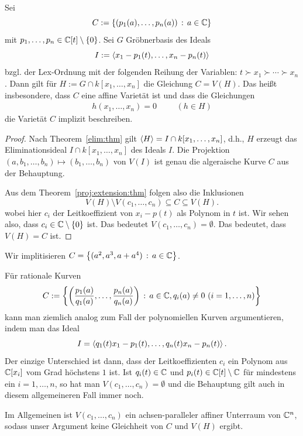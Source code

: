 \documentclass[11pt]{article}
\numberwithin{equation}{section}
\begin{document}
\begin{corollary} 
	Sei 	\[
	C:=\left\{  (p_1(a),\ldots, p_n(a))  \,:\,  a \in \mathbb{C} \right\} 
	\]
	mit $p_1,\ldots, p_n \in \mathbb{C}[t] \setminus \{0\}$. Sei $G$ Gröbnerbasis des Ideals 
	\[	I:=\left< x_1 - p_1(t),\ldots, x_n -p_n(t) \right>
	\] bzgl. der Lex-Ordnung mit der folgenden Reihung der Variablen: $t \succ x_1 \succ \cdots \succ x_n$. Dann gilt für 
	\(
		H:= G \cap k[x_1,\ldots,x_n]
	\)
	die Gleichung $C = V(H)$. Das heißt insbesondere, dass $C$ eine affine Varietät ist  und dass die Gleichungen 
	\begin{align*} 
		h(x_1,\ldots,x_n) =0 &  & & (h  \in H)
	\end{align*} 
 	die Varietät $C$ implizit beschreiben. 
\end{corollary} 
\begin{proof} 
	Nach Theorem~\ref{elim:thm} gilt $\left< H \right> = I \cap k[x_1,\ldots,x_n]$, d.h., $H$ erzeugt das Eliminationsideal $I \cap k[x_1,\ldots,x_n]$ des Ideals $I$. Die Projektion $(a,b_1,\ldots,b_n) \mapsto (b_1,\ldots,b_n)$ von $V(I)$ ist genau die algeraische Kurve $C$ aus der Behauptung. 
	
	Aus dem Theorem~\ref{proj:extension:thm} folgen also die Inklusionen 
	\[
			V(H) \setminus V(c_1,\ldots,c_n)  \subseteq C \subseteq V(H). 
	\]
	wobei hier $c_i$ der Leitkoeffizient von $x_i - p(t)$ als Polynom in $t$ ist. Wir sehen also, dass $c_i \in \mathbb{C} \setminus \{0\}$ ist. Das bedeutet $V(c_1,\ldots, c_n) = \emptyset$. Das bedeutet, dass $V(H) = C$ ist. 
\end{proof} 

\begin{beispiel} 
	Wir implitisieren $C = \left\{  (a^2, a^3, a+a^4) \,:\, a \in \mathbb{C} \right\}$. 
\end{beispiel} 

\begin{remark}
	Für rationale Kurven 
	\[
		C := \left\{  \left( \frac{p_1(a)}{q_1(a)}, \ldots , \frac{p_n(a)}{q_n(a)} \right)  \,:\, a \in \mathbb{C}, q_i(a) \ne 0 \ (i=1,\ldots,n)  \right\}
	\]
	kann man ziemlich analog zum Fall der polynomiellen Kurven argumentieren, indem man das Ideal 
	\[
		I = \left<  q_1(t) x_1 - p_1(t) ,\ldots, q_n(t) x_n - p_n(t)  \right>. 
	\]
	Der einzige Unterschied ist dann, dass der Leitkoeffizienten $c_i$ ein Polynom aus $\mathbb{C}[x_i]$ vom Grad höchstens $1$ ist. Ist $q_i(t) \in \mathbb{C}$ und $p_i(t) \in \mathbb{C}[t] \setminus \mathbb{C}$ für mindestens ein $i=1,\ldots,n$, so hat man $V(c_1,\ldots,c_n) = \emptyset$ und die Behauptung gilt auch in diesem allgemeineren Fall  immer noch. 
	
	Im Allgemeinen ist $V(c_1,\ldots,c_n)$ ein achsen-paralleler affiner Unterraum von $\mathbb{C}^n$, sodass unser Argument keine Gleichheit von $C$ und $V(H)$ ergibt. 
\end{remark} 
\end{document}
